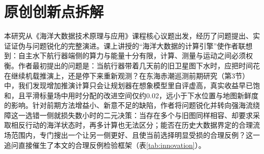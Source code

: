 \section{原创创新点拆解}

本研究从《海洋大数据技术原理与应用》课程核心议题出发，经历了问题提出、实证证伪与问题锐化的完整演进。课上讲授的“海洋大数据的计算引擎”使作者联想到：自主水下航行器端侧的算力与能量十分有限，计算、测量与运动之间必须权衡。作者最初提出的问题是：当航行器带着几天前的旧卫星图下水时，应把时间花在继续机载推演上，还是停下来重新观测？在东海赤潮巡测前期研究（第3节）中，我们发现增加推演计算只会让规划器在想象模型里自评虚高，真实收益早已饱和，且平滑标量场中用时分配的改进空间仅约0.02，远小于下水位置与地图新鲜度的影响。针对前期方法增益小、新意不足的缺陷，作者将问题锐化并转向强海流绕障这一选错一侧就损失数小时的二元决策：当存在多个与旧图同样相容、却要求采取相反行动的海洋状态时，再多计算也无法区分；能否在历史大数据界定的合理流场范围内，专门搜出一个让另一侧更好、且使当前选择明显受损的合理反例？这一追问直接催生了本文的合理反例检验框架（表\ref{tab:innovation}）。

